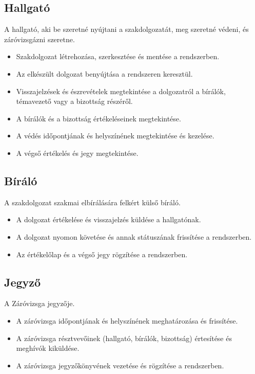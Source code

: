 \documentclass[a4paper,12pt]{article}
\begin{document}
\subsection{Hallgató}

A hallgató, aki be szeretné nyújtani a szakdolgozatát, meg szeretné védeni, és záróvizsgázni szeretne.

\begin{itemize}
\item Szakdolgozat létrehozása, szerkesztése és mentése a rendszerben.
\item Az elkészült dolgozat benyújtása a rendszeren keresztül.
\item Visszajelzések és észrevételek megtekintése a dolgozatról a bírálók, témavezető vagy a bizottság részéről.
\item A bírálók és a bizottság értékeléseinek megtekintése.
\item A védés időpontjának és helyszínének megtekintése és kezelése.
\item A végső értékelés és jegy megtekintése.
\end{itemize}

\subsection{Bíráló}

A szakdolgozat szakmai elbírálására felkért külső bíráló.

\begin{itemize}
	\item A dolgozat értékelése és visszajelzés küldése a hallgatónak.
	\item A dolgozat nyomon követése és annak státuszának frissítése a rendszerben.
	\item Az értékelőlap és a végső jegy rögzítése a rendszerben.
\end{itemize}

\subsection{Jegyző}

A Záróvizsga jegyzője.

\begin{itemize}
	\item A záróvizsga időpontjának és helyszínének meghatározása és frissítése.
	\item A záróvizsga résztvevőinek (hallgató, bírálók, bizottság) értesítése és meghívók kiküldése.
	\item A záróvizsga jegyzőkönyvének vezetése és rögzítése a rendszerben.
\end{itemize}
\end{document}
